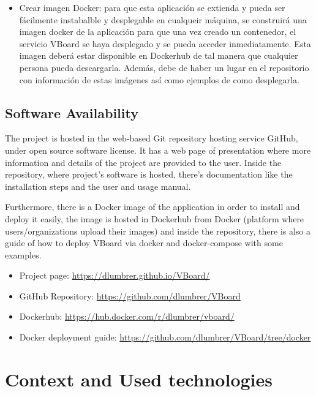 \documentclass[a4paper, 12pt]{book}
\begin{document}
\begin{itemize}
\item Crear imagen Docker: para que esta aplicación se extienda y pueda ser fácilmente instabalble y desplegable en cualqueir máquina, se construirá una imagen docker de la aplicación para que una vez creado un contenedor, el servicio VBoard se haya desplegado y se pueda acceder inmediatamente. Esta imagen deberá estar disponible en Dockerhub de tal manera que cualquier persona pueda descargarla. Además, debe de haber un lugar en el repositorio con información de estas imágenes así como ejemplos de como desplegarla.
\end{itemize}

\section{Software Availability}
\label{sec:softavail}

The project is hosted in the web-based Git repository hosting service GitHub, under open source software license. It has a web page of presentation where more information and details of the project are provided to the user. Inside the repository, where project's software is hosted, there's documentation like the installation steps and the user and usage manual.

Furthermore, there is a Docker image of the application in order to install and deploy it easily, the image is hosted in Dockerhub from Docker (platform where users/organizations upload their images) and inside the repository, there is also a guide of how to deploy VBoard via docker and docker-compose with some examples. 

\begin{itemize}
\item Project page: \url{https://dlumbrer.github.io/VBoard/}
\item GitHub Repository: \url{https://github.com/dlumbrer/VBoard}
\item Dockerhub: \url{https://hub.docker.com/r/dlumbrer/vboard/}
\item Docker deployment guide: \url{https://github.com/dlumbrer/VBoard/tree/docker}
\end{itemize}



\chapter{Context and Used technologies}
\end{document}
